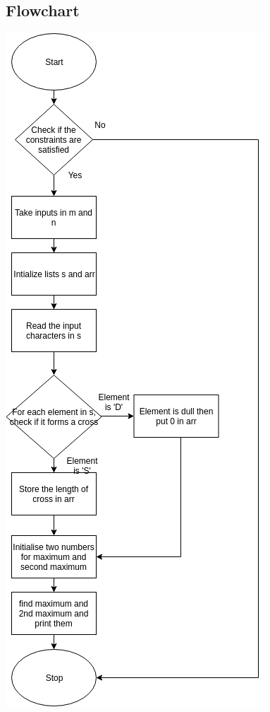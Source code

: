 \documentclass[12pt]{article}
\begin{document}
{\subsection{Flowchart}
\includegraphics[scale=0.5]{f1.png}
\newpage

}
\end{document}
